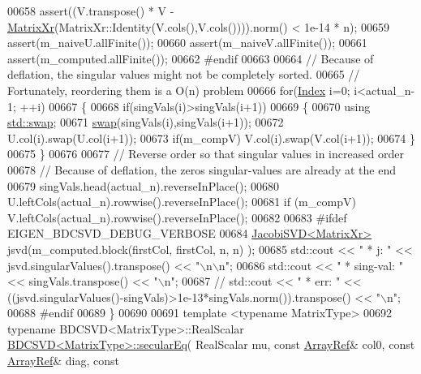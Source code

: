 \begin{DoxyCode}
00658   assert((V.transpose() * V - \hyperlink{group___core___module}{MatrixXr}(MatrixXr::Identity(V.cols(),V.cols()))).norm() < 1e-14 * n);
00659   assert(m\_naiveU.allFinite());
00660   assert(m\_naiveV.allFinite());
00661   assert(m\_computed.allFinite());
00662 \textcolor{preprocessor}{#endif}
00663   
00664   \textcolor{comment}{// Because of deflation, the singular values might not be completely sorted.}
00665   \textcolor{comment}{// Fortunately, reordering them is a O(n) problem}
00666   \textcolor{keywordflow}{for}(\hyperlink{namespace_eigen_a62e77e0933482dafde8fe197d9a2cfde}{Index} i=0; i<actual\_n-1; ++i)
00667   \{
00668     \textcolor{keywordflow}{if}(singVals(i)>singVals(i+1))
00669     \{
00670       \textcolor{keyword}{using} \hyperlink{endian_8c_a3ca5ecd34b04d6a243c054ac3a57f68d}{std::swap};
00671       \hyperlink{endian_8c_a3ca5ecd34b04d6a243c054ac3a57f68d}{swap}(singVals(i),singVals(i+1));
00672       U.col(i).swap(U.col(i+1));
00673       \textcolor{keywordflow}{if}(m\_compV) V.col(i).swap(V.col(i+1));
00674     \}
00675   \}
00676   
00677   \textcolor{comment}{// Reverse order so that singular values in increased order}
00678   \textcolor{comment}{// Because of deflation, the zeros singular-values are already at the end}
00679   singVals.head(actual\_n).reverseInPlace();
00680   U.leftCols(actual\_n).rowwise().reverseInPlace();
00681   \textcolor{keywordflow}{if} (m\_compV) V.leftCols(actual\_n).rowwise().reverseInPlace();
00682   
00683 \textcolor{preprocessor}{#ifdef EIGEN\_BDCSVD\_DEBUG\_VERBOSE}
00684   \hyperlink{group___s_v_d___module_class_eigen_1_1_jacobi_s_v_d}{JacobiSVD<MatrixXr>} jsvd(m\_computed.block(firstCol, firstCol, n, n) );
00685   std::cout << \textcolor{stringliteral}{"  * j:        "} << jsvd.singularValues().transpose() << \textcolor{stringliteral}{"\(\backslash\)n\(\backslash\)n"};
00686   std::cout << \textcolor{stringliteral}{"  * sing-val: "} << singVals.transpose() << \textcolor{stringliteral}{"\(\backslash\)n"};
00687 \textcolor{comment}{//   std::cout << "  * err:      " << ((jsvd.singularValues()-singVals)>1e-13*singVals.norm()).transpose()
       << "\(\backslash\)n";}
00688 \textcolor{preprocessor}{#endif}
00689 \}
00690 
00691 \textcolor{keyword}{template} <\textcolor{keyword}{typename} MatrixType>
00692 \textcolor{keyword}{typename} BDCSVD<MatrixType>::RealScalar \hyperlink{group___s_v_d___module_class_eigen_1_1_b_d_c_s_v_d}{BDCSVD<MatrixType>::secularEq}(
      RealScalar mu, \textcolor{keyword}{const} \hyperlink{group___core___module_class_eigen_1_1_ref}{ArrayRef}& col0, \textcolor{keyword}{const} \hyperlink{group___core___module_class_eigen_1_1_ref}{ArrayRef}& diag, \textcolor{keyword}{const} 

\end{DoxyCode}
